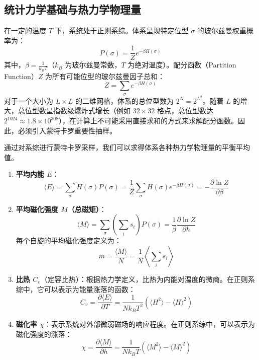 \documentclass[11pt]{article}
\begin{document}
\subsection{统计力学基础与热力学物理量}
在一定的温度 $T$ 下，系统处于正则系综。体系呈现特定位型 $\sigma$ 的玻尔兹曼权重概率为：
\begin{equation}
    P(\sigma) = \frac{1}{Z} e^{-\beta H(\sigma)}
\end{equation}
其中，$\beta = \frac{1}{k_B T}$（$k_B$ 为玻尔兹曼常数，$T$ 为绝对温度）。配分函数（Partition Function）$Z$ 为所有可能位型的玻尔兹曼因子总和：
\begin{equation}
    Z = \sum_{\sigma} e^{-\beta H(\sigma)}
\end{equation}
对于一个大小为 $L \times L$ 的二维网格，体系的总位型数为 $2^N = 2^{L^2}$。随着 $L$ 的增大，总位型数呈指数级爆炸式增长（例如 $32 \times 32$ 格点，总位型数达 $2^{1024} \approx 1.8 \times 10^{308}$），在计算上不可能采用直接求和的方式来求解配分函数。因此，必须引入蒙特卡罗重要性抽样。

通过对系综进行蒙特卡罗采样，我们可以求得体系各种热力学物理量的平衡平均值。
\begin{enumerate}
    \item \textbf{平均内能 $E$}：
        \begin{equation}
            \langle E \rangle = \sum_{\sigma} H(\sigma) P(\sigma) = \frac{1}{Z} \sum_{\sigma} H(\sigma) e^{-\beta H(\sigma)} = -\frac{\partial \ln Z}{\partial \beta}
        \end{equation}
    \item \textbf{平均磁化强度 $M$（总磁矩）}：
        \begin{equation}
            \langle M \rangle = \sum_{\sigma} \left( \sum_i s_i \right) P(\sigma) = \frac{1}{\beta} \frac{\partial \ln Z}{\partial h}
        \end{equation}
        每个自旋的平均磁化强度定义为：
        \begin{equation}
            m = \frac{\langle M \rangle}{N} = \frac{1}{N} \left\langle \sum_i s_i \right\rangle
        \end{equation}
    \item \textbf{比热 $C_v$}（定容比热）：根据热力学定义，比热为内能对温度的微商。在正则系综中，它可以表示为能量涨落的函数：
        \begin{equation}
            C_v = \frac{\partial \langle E \rangle}{\partial T} = \frac{1}{N k_B T^2} \left( \langle H^2 \rangle - \langle H \rangle^2 \right)
        \end{equation}
    \item \textbf{磁化率 $\chi$}：表示系统对外部微弱磁场的响应程度。在正则系综中，可以表示为磁化强度的涨落：
        \begin{equation}
            \chi = \frac{\partial \langle M \rangle}{\partial h} = \frac{1}{N k_B T} \left( \langle M^2 \rangle - \langle M \rangle^2 \right)
        \end{equation}
\end{enumerate}
\end{document}
